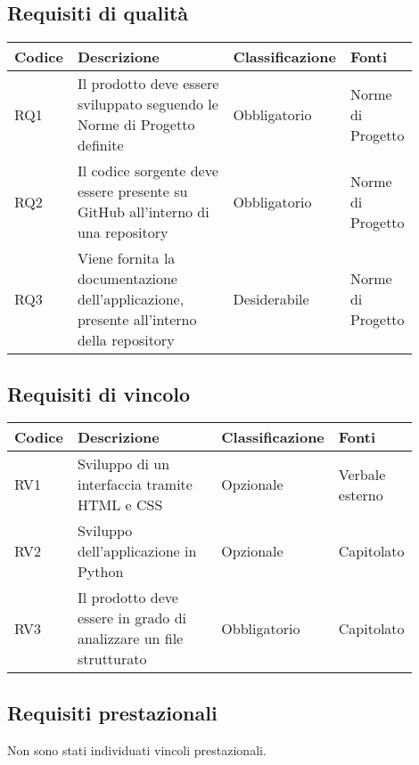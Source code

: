 \subsection{Requisiti di qualità}
\begin{center}
	\begin{tabular}{ |p{0.10\linewidth}|p{0.50\linewidth}|p{0.15\linewidth}|p{0.15\linewidth}| }
		\hline
		\textbf{Codice} & \textbf{Descrizione} & \textbf{Classificazione} & \textbf{Fonti} \\
		\hline
		RQ1 & Il prodotto deve essere sviluppato seguendo le Norme di Progetto definite & Obbligatorio & Norme di Progetto \\
		\hline
		RQ2 & Il codice sorgente deve essere presente su GitHub all'interno di una repository & Obbligatorio & Norme di Progetto \\
		\hline
		RQ3 & Viene fornita la documentazione dell'applicazione, presente all'interno della repository & Desiderabile & Norme di Progetto \\
		\hline
	\end{tabular}
\end{center}

\subsection{Requisiti di vincolo}
\begin{center}
	\begin{tabular}{ |p{0.10\linewidth}|p{0.50\linewidth}|p{0.15\linewidth}|p{0.15\linewidth}| }
		\hline
		\textbf{Codice} & \textbf{Descrizione} & \textbf{Classificazione} & \textbf{Fonti} \\
		\hline
		RV1 & Sviluppo di un interfaccia tramite HTML e CSS & Opzionale & Verbale esterno \\
		\hline
		RV2 & Sviluppo dell'applicazione in Python & Opzionale & Capitolato \\
		\hline
		RV3 & Il prodotto deve essere in grado di analizzare un file strutturato & Obbligatorio & Capitolato \\
		\hline
	\end{tabular}
\end{center}

\subsection{Requisiti prestazionali}
Non sono stati individuati vincoli prestazionali.

